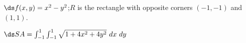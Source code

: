 {$\ds f(x,y) = x^2-y^2$;\quad $R$ is the rectangle with opposite corners $(-1,-1)$ and $(1,1)$.

}
{$\ds SA = \int_{-1}^{1}\int_{-1}^{1} \sqrt{1+ 4x^2+4y^2}\ dx\ dy$
}